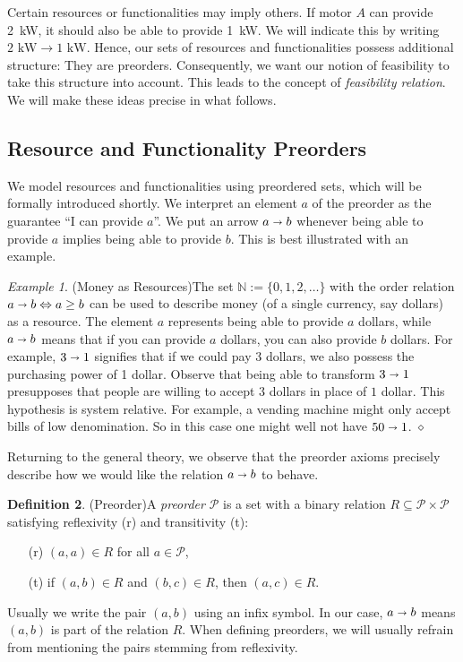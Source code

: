 \documentclass[12pt]{article}
\theoremstyle{definition}
\newtheorem{definition}{Definition}[section]
\theoremstyle{plain}
\theoremstyle{plain}
\theoremstyle{plain}
\theoremstyle{plain}
\theoremstyle{remark}
\newtheorem{example}[definition]{Example}
\newcommand\xqed[1]{%
	\leavevmode\unskip\penalty9999 \hbox{}\nobreak\hfill
	\quad\hbox{#1}}
\newcommand\exampleend{\xqed{$\diamond$}}
\theoremstyle{remark}
\newcommand{\mc}[1]{\mathcal{#1}}
\newcommand{\sub}{\subseteq}
\begin{document}
Certain resources or functionalities may imply others. If motor $A$ can provide \mbox{2 kW}, it should also be able to provide \mbox{1 kW}. We will indicate this by writing $2 \text{ kW} \rightarrow 1 \text{ kW}$. Hence, our sets of resources and functionalities possess additional structure: They are preorders. Consequently, we want our notion of feasibility to take this structure into account. This leads to the concept of \emph{feasibility relation}. We will make these ideas precise in what follows.

\subsection{Resource and Functionality Preorders}

We model resources and functionalities using preordered sets, which will be formally introduced shortly. We interpret an element $a$ of the preorder as the guarantee ``I can provide $a$''. We put an arrow $a \shortrightarrow b$ whenever being able to provide $a$ implies being able to provide $b$. This is best illustrated with an example.

\begin{example}(Money as Resources)\label{ex:money}
	The set $\mathbb{N} := \{0,1,2,\ldots \}$ with the order relation $a \shortrightarrow b \Leftrightarrow a \geq b$ can be used to describe money (of a single currency, say dollars) as a resource. The element $a$ represents being able to provide $a$ dollars, while $a \shortrightarrow b$ means that if you can provide $a$ dollars, you can also provide $b$ dollars. For example, $3 \shortrightarrow 1$ signifies that if we could pay 3 dollars, we also possess the purchasing power of 1 dollar. Observe that being able to transform $3 \shortrightarrow 1$ presupposes that people are willing to accept $3$ dollars in place of $1$ dollar. This hypothesis is system relative. For example, a vending machine might only accept bills of low denomination. So in this case one might well not have $50 \shortrightarrow 1$. \exampleend
\end{example}

Returning to the general theory, we observe that the preorder axioms precisely describe how we would like the relation $a \shortrightarrow b$ to behave.

\begin{definition}(Preorder)\label{def:preorder}
	A \emph{preorder} $\mc{P}$ is a set with a binary relation $R \sub \mc{P} \times \mc{P}$ satisfying reflexivity (r) and transitivity (t):
	\begin{itemize}
		\item[(r)] $(a,a) \in R$ for all $a \in \mc{P}$,
		\item[(t)] if $(a,b) \in R$ and $(b,c) \in R$, then $(a,c) \in R$.
	\end{itemize}
	Usually we write the pair $(a,b)$ using an infix symbol. In our case, $a \shortrightarrow b$ means $(a,b)$ is part of the relation $R$. When defining preorders, we will usually refrain from mentioning the pairs stemming from reflexivity.
\end{definition}
\end{document}
